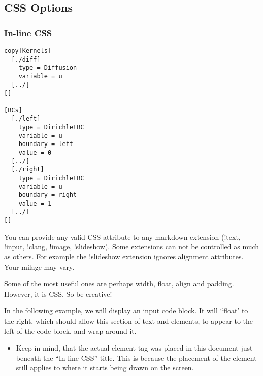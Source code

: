 \documentclass[]{report}
\begin{document}
\subsection{CSS Options\label{css-options}}\subsubsection{In-line CSS\label{in-line-css}}
\par
\begin{lstlisting}[caption=\href{https://github.com/idaholab/moose/blob/master/test/tests/kernels/simple\_diffusion/simple\_diffusion.i}{test/tests/kernels/simple\_diffusion/simple\_diffusion.i}]
copy[Kernels]
  [./diff]
    type = Diffusion
    variable = u
  [../]
[]

[BCs]
  [./left]
    type = DirichletBC
    variable = u
    boundary = left
    value = 0
  [../]
  [./right]
    type = DirichletBC
    variable = u
    boundary = right
    value = 1
  [../]
[]
\end{lstlisting}
\par
You can provide any valid CSS attribute to any markdown extension (!text, !input, !clang, !image, !slideshow). Some extensions can not be controlled as much as others. For example the !slideshow extension ignores alignment attributes. Your milage may vary.
\par
Some of the most useful ones are perhaps width, float, align and padding. However, it is CSS. So be creative!
\par
In the following example, we will display an input code block. It will ``float' to the right, which should allow this section of text and elements, to appear to the left of the code block, and wrap around it.\begin{itemize}
\item Keep in mind, that the actual element tag was placed in this document just beneath the ``In-line CSS'' title. This is because the placement of the element still applies to where it starts being drawn on the screen.
\end{itemize}
\end{document}
